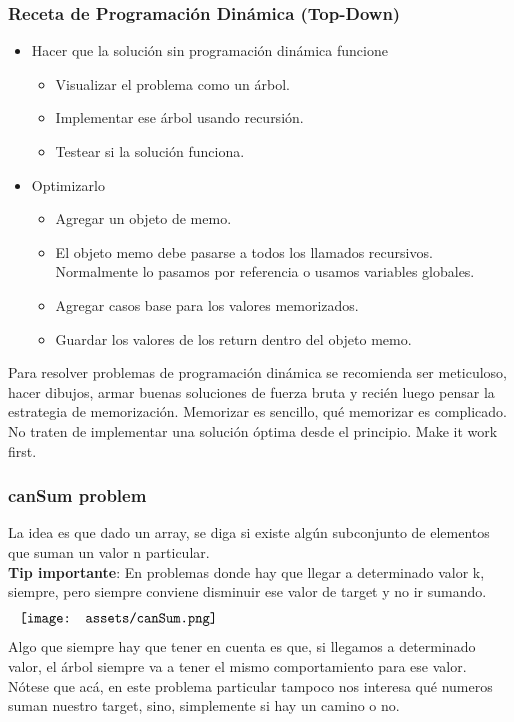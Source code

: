 \documentclass[10pt,a4paper]{article}
\begin{document}
\subsubsection*{Receta de Programación Dinámica (Top-Down)}
\begin{itemize}
    \item Hacer que la solución sin programación dinámica funcione
    \begin{itemize}
        \item Visualizar el problema como un árbol.
        \item Implementar ese árbol usando recursión.
        \item Testear si la solución funciona. 
    \end{itemize}
    \item Optimizarlo
    \begin{itemize}
        \item Agregar un objeto de memo.
        \item El objeto memo debe pasarse a todos los llamados recursivos. Normalmente lo pasamos por referencia o usamos variables globales.
        \item Agregar casos base para los valores memorizados.
        \item Guardar los valores de los return dentro del objeto memo.
    \end{itemize}
\end{itemize}
Para resolver problemas de programación dinámica se recomienda ser meticuloso, hacer dibujos, armar buenas soluciones de fuerza bruta y recién luego pensar la estrategia de memorización. Memorizar es sencillo, qué memorizar es complicado. \\
No traten de implementar una solución óptima desde el principio. Make it work first.
\subsubsection*{canSum problem}
La idea es que dado un array, se diga si existe algún subconjunto de elementos que suman un valor n particular. \\
\textbf{Tip importante}: En problemas donde hay que llegar a determinado valor k, siempre, pero siempre conviene disminuir ese valor de target y no ir sumando.
\[\begin{minipage}[b]{1\textwidth}
    \texttt{[image: assets/canSum.png]}
\end{minipage}\]
Algo que siempre hay que tener en cuenta es que, si llegamos a determinado valor, el árbol siempre va a tener el mismo comportamiento para ese valor. Nótese que acá, en este problema particular tampoco nos interesa qué numeros suman nuestro target, sino, simplemente si hay un camino o no.
\end{document}
